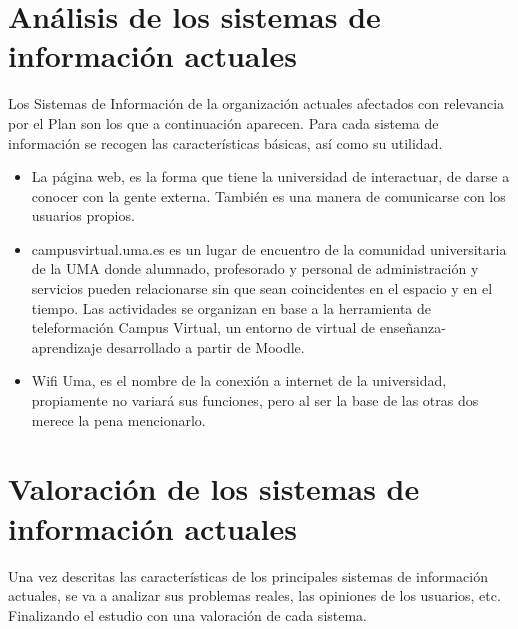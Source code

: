 \documentclass[11pt,a4paper,spanish,twoside]{book}
\begin{document}
\section{Análisis de los sistemas de información actuales}
Los Sistemas de Información de la organización actuales afectados con 
relevancia por el Plan son los que a continuación aparecen. Para cada sistema 
de información se recogen las características básicas, así como su utilidad.
\begin{itemize}
  \item La página web, es la forma que tiene la universidad de interactuar, de 
darse a conocer con la gente externa. También es una manera de comunicarse con
los usuarios propios.
  \item campusvirtual.uma.es es un lugar de encuentro de la comunidad 
universitaria de la UMA donde alumnado, profesorado y personal de 
administración y servicios pueden relacionarse sin que sean coincidentes en el 
espacio y en el tiempo. Las actividades se organizan en base a la herramienta 
de teleformación Campus Virtual, un entorno de virtual de enseñanza-aprendizaje 
desarrollado a partir de Moodle.
  \item Wifi Uma, es el nombre de la conexión a internet de la universidad, 
propiamente no variará sus funciones, pero al ser la base de las otras dos 
merece la pena mencionarlo. 

\end{itemize}
\section{Valoración de los sistemas de información actuales}

Una vez descritas las características de los principales sistemas de 
información actuales, se va a analizar sus problemas reales, las opiniones de 
los usuarios, etc. Finalizando el estudio con una valoración de cada sistema.
\end{document}
